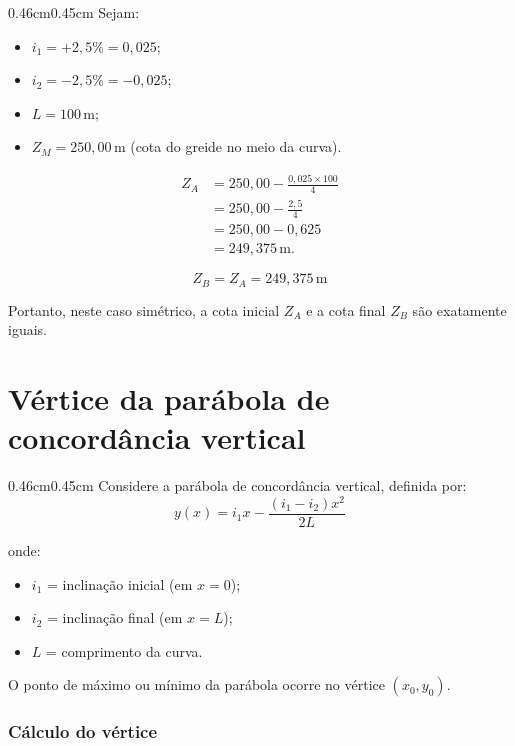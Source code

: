 \documentclass[12pt,letterpaper]{article}
\newenvironment{corpo}{\begin{adjustwidth}{0.46cm}{0.45cm}\justifying}{\end{adjustwidth}}
\begin{document}
\begin{corpo}
Sejam:
\begin{itemize}
    \item $i_1=+2{,}5\%=0{,}025$;
    \item $i_2=-2{,}5\%=-0{,}025$;
    \item $L=100\,\text{m}$;
    \item $Z_M=250{,}00\,\text{m}$ (cota do greide no meio da curva).
\end{itemize}

\[
\begin{aligned}
Z_A
&=250{,}00-\frac{0{,}025\times 100}{4} \\
&=250{,}00-\frac{2{,}5}{4} \\
&=250{,}00-0{,}625 \\
&=249{,}375\,\text{m}.
\end{aligned}
\]

\[
 Z_B=Z_A=249{,}375\,\text{m}
\]

Portanto, neste caso simétrico, a cota inicial $Z_A$ e a cota final $Z_B$ são exatamente iguais.
\end{corpo}

\section*{Vértice da parábola de concordância vertical}

\begin{corpo}
Considere a parábola de concordância vertical, definida por:
\[
 y(x)=i_1x-\frac{(i_1-i_2)x^2}{2L}
\]

onde:
\begin{itemize}
    \item $i_1$ = inclinação inicial (em $x=0$);
    \item $i_2$ = inclinação final (em $x=L$);
    \item $L$ = comprimento da curva.
\end{itemize}

O ponto de máximo ou mínimo da parábola ocorre no vértice $(x_0,y_0)$.
\end{corpo}

\subsubsection*{Cálculo do vértice}
\end{document}
